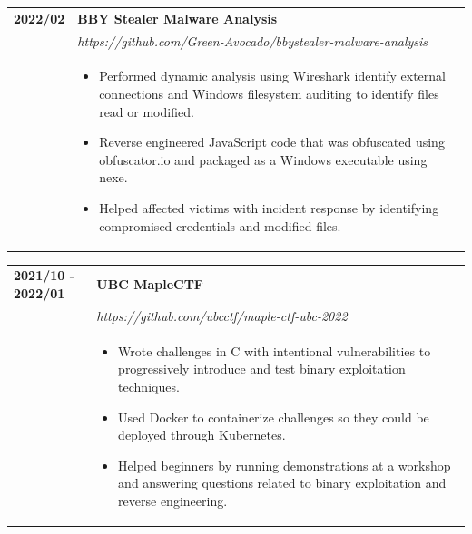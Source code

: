 \documentclass[letterpaper]{article}
\begin{document}
        \begin{tabular}{p{} p{}}
            \textbf{2022/02} & \textbf{BBY Stealer Malware Analysis} \\
            & \emph{https://github.com/Green-Avocado/bbystealer-malware-analysis} \\
            & \begin{itemize}
                \item Performed dynamic analysis using Wireshark identify external connections and Windows
                    filesystem auditing to identify files read or modified.
                \item Reverse engineered JavaScript code that was obfuscated using obfuscator.io and
                    packaged as a Windows executable using nexe.
                \item Helped affected victims with incident response by identifying compromised
                    credentials and modified files.
            \end{itemize}
            \\
        \end{tabular}

        \begin{tabular}{p{} p{}}
            \textbf{2021/10 - 2022/01} & \textbf{UBC MapleCTF} \\
            & \emph{https://github.com/ubcctf/maple-ctf-ubc-2022} \\
            & \begin{itemize}
                \item Wrote challenges in C with intentional vulnerabilities to progressively introduce
                    and test binary exploitation techniques.
                \item Used Docker to containerize challenges so they could be deployed through Kubernetes.
                \item Helped beginners by running demonstrations at a workshop and answering questions
                    related to binary exploitation and reverse engineering.
            \end{itemize}
            \\
        \end{tabular}
\end{document}
